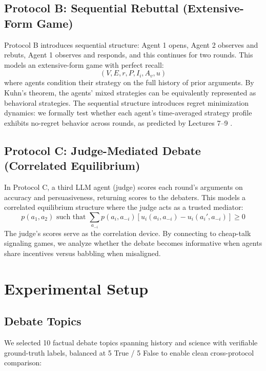 \documentclass[11pt, oneside]{article}
\begin{document}
\subsection{Protocol B: Sequential Rebuttal (Extensive-Form Game)}

Protocol B introduces sequential structure: Agent 1 opens, Agent 2 observes and rebuts, Agent 1 observes and responds, and this continues for two rounds. This models an extensive-form game with perfect recall:
\[
(V, E, r, P, I_i, A_v, u)
\]
where agents condition their strategy on the full history of prior arguments. By Kuhn's theorem, the agents' mixed strategies can be equivalently represented as behavioral strategies. The sequential structure introduces regret minimization dynamics: we formally test whether each agent's time-averaged strategy profile exhibits no-regret behavior across rounds, as predicted by Lectures 7--9 \cite{lekeas2026}.

\subsection{Protocol C: Judge-Mediated Debate (Correlated Equilibrium)}

In Protocol C, a third LLM agent (judge) scores each round's arguments on accuracy and persuasiveness, returning scores to the debaters. This models a correlated equilibrium structure where the judge acts as a trusted mediator:
\[
p(a_1, a_2) \text{ such that } \sum_{a_{-i}} p(a_i, a_{-i}) [u_i(a_i, a_{-i}) - u_i(a_i', a_{-i})] \geq 0
\]
The judge's scores serve as the correlation device. By connecting to cheap-talk signaling games, we analyze whether the debate becomes informative when agents share incentives versus babbling when misaligned.

\section{Experimental Setup}

\subsection{Debate Topics}

We selected 10 factual debate topics spanning history and science with verifiable ground-truth labels, balanced at 5 True / 5 False to enable clean cross-protocol comparison:
\end{document}
